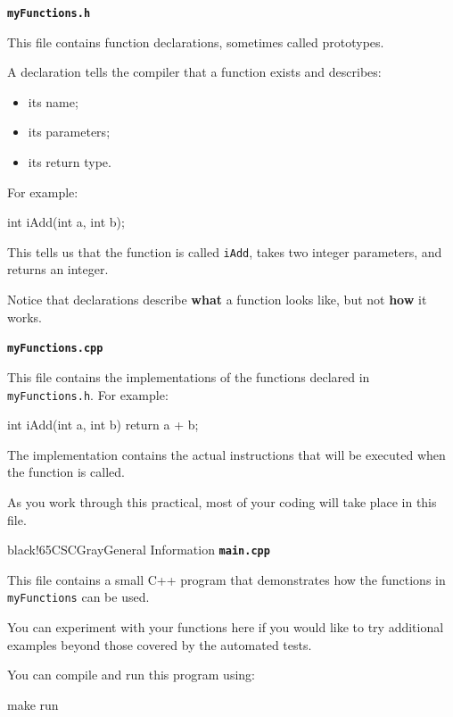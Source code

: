 \documentclass{csc2059practical}
\begin{document}
\begin{infobox}
\textbf{\texttt{myFunctions.h}}

This file contains function declarations, sometimes called prototypes.

A declaration tells the compiler that a function exists and describes:

\begin{itemize}
  \item its name;
  \item its parameters;
  \item its return type.
\end{itemize}

For example:

\begin{cppcode}
int iAdd(int a, int b);
\end{cppcode}

This tells us that the function is called \texttt{iAdd}, takes two integer parameters, and returns an integer.

Notice that declarations describe \textbf{what} a function looks like, but not \textbf{how} it works.
\end{infobox}

\begin{infobox}
\textbf{\texttt{myFunctions.cpp}}

This file contains the implementations of the functions declared in \texttt{myFunctions.h}. For example:

\begin{cppcode}
int iAdd(int a, int b)
{
    return a + b;
}
\end{cppcode}

The implementation contains the actual instructions that will be executed when the function is called.

As you work through this practical, most of your coding will take place in this file.
\end{infobox}

\begin{csccalloutbase}[unbreakable]{black!65}{CSCGray}{General Information}{\cscIconInfo}
\textbf{\texttt{main.cpp}}

This file contains a small C++ program that demonstrates how the functions in \texttt{myFunctions} can be used.

You can experiment with your functions here if you would like to try additional examples beyond those covered by the automated tests.

You can compile and run this program using:

\begin{bashcode}
make run
\end{bashcode}
\end{csccalloutbase}
\end{document}
